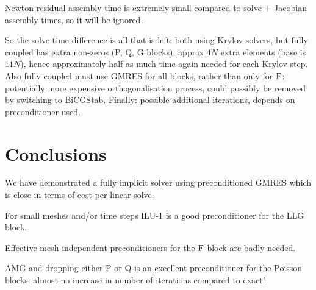 Newton residual assembly time is extremely small compared to solve + Jacobian assembly times, so it will be ignored.

So the solve time difference is all that is left: both using Krylov solvers, but fully coupled has extra non-zeros (P, Q, G blocks), approx $4N$ extra elements (base is $11N$), hence approximately half as much time again needed for each Krylov step.
Also fully coupled must use GMRES for all blocks, rather than only for $\mathrm{F}$: potentially more expensive orthogonalisation process, could possibly be removed by switching to BiCGStab.
Finally: possible additional iterations, depends on preconditioner used.



\section{Conclusions}

We have demonstrated a fully implicit solver using preconditioned GMRES which is close in terms of cost per linear solve.

For small meshes and/or time steps ILU-1 is a good preconditioner for the LLG block.

Effective mesh independent preconditioners for the $\mathrm{F}$ block are badly needed.

AMG and dropping either P or Q is an excellent preconditioner for the Poisson blocks: almost no increase in number of iterations compared to exact!



